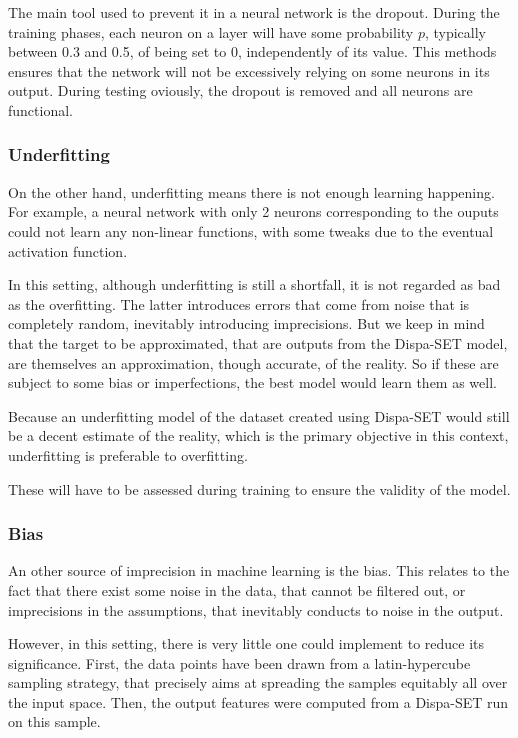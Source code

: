 The main tool used to prevent it in a neural network is the dropout. During the training phases, each neuron on a layer will have some probability $p$, typically between 0.3 and 0.5, of being set to 0, independently of its value. This methods ensures that the network will not be excessively relying on some neurons in its output. During testing oviously, the dropout is removed and all neurons are functional.

\subsubsection{Underfitting}

On the other hand, underfitting means there is not enough learning happening. For example, a neural network with only 2 neurons corresponding to the ouputs could not learn any non-linear functions, with some tweaks due to the eventual activation function.

In this setting, although underfitting is still a shortfall, it is not regarded as bad as the overfitting. The latter introduces errors that come from noise that is completely random, inevitably introducing imprecisions. But we keep in mind that the target to be approximated, that are outputs from the Dispa-SET model, are themselves an approximation, though accurate, of the reality. So if these are subject to some bias or imperfections, the best model would learn them as well.

Because an underfitting model of the dataset created using Dispa-SET would still be a decent estimate of the reality, which is the primary objective in this context, underfitting is preferable to overfitting.

These will have to be assessed during training to ensure the validity of the model.

\subsubsection{Bias\label{ssec:bias}}

An other source of imprecision in machine learning is the bias. This relates to the fact that there exist some noise in the data, that cannot be filtered out, or imprecisions in the assumptions, that inevitably conducts to noise in the output.

However, in this setting, there is very little one could implement to reduce its significance. First, the data points have been drawn from a latin-hypercube sampling strategy, that precisely aims at spreading the samples equitably all over the input space. Then, the output features were computed from a Dispa-SET run on this sample.

